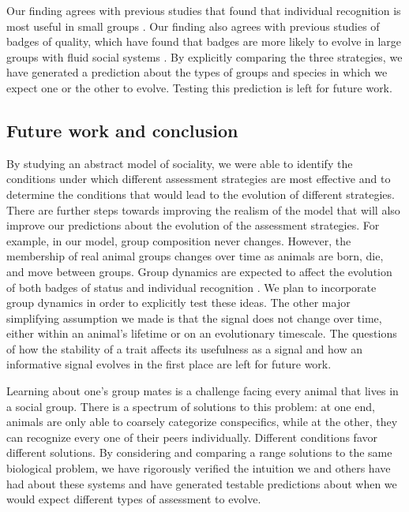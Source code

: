 Our finding agrees with previous studies that found that individual recognition is most useful in small groups \citep{Veiga:1993fk}. Our finding also agrees with previous studies of badges of quality, which have found that badges are more likely to evolve in large groups with fluid social systems \citep{Rohwer:1975fk,Tibbetts:2009kx}. By explicitly comparing the three strategies, we have generated a prediction about the types of groups and species in which we expect one or the other to evolve. Testing this prediction is left for future work. 

\subsection*{Future work and conclusion}
 
By studying an abstract model of sociality, we were able to identify the conditions under which different assessment strategies are most effective and to determine the conditions that would lead to the evolution of different strategies. There are further steps towards improving the realism of the model that will also improve our predictions about the evolution of the assessment strategies. For example, in our model, group composition never changes. However, the membership of real animal groups changes over time as animals are born, die, and move between groups. Group dynamics are expected to affect the evolution of both badges of status \citep{Rohwer:1975fk,Tibbetts:2009kx} and individual recognition \citep{Whitfield:1987tg,Veiga:1993fk}. We plan to incorporate group dynamics in order to explicitly test these ideas. The other major simplifying assumption we made is that the signal does not change over time, either within an animal's lifetime or on an evolutionary timescale. The questions of how the stability of a trait affects its usefulness as a signal and how an informative signal evolves in the first place are left for future work.

Learning about one's group mates is a challenge facing every animal that lives in a social group. There is a spectrum of solutions to this problem: at one end, animals are only able to coarsely categorize conspecifics, while at the other, they can recognize every one of their peers individually. Different conditions favor different solutions. By considering and comparing a range solutions to the same biological problem, we have rigorously verified the intuition we and others have had about these systems and have generated testable predictions about when we would expect different types of assessment to evolve. 

